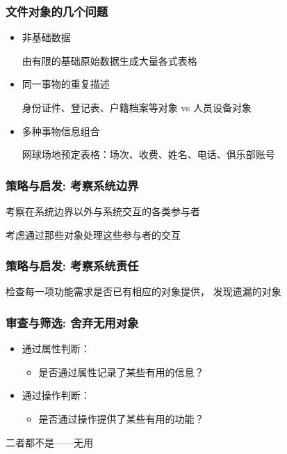 \documentclass[compress]{beamer}
\begin{document}
\begin{frame}
  \frametitle{文件对象的几个问题}
  \begin{itemize}
    \item 非基础数据
      \begin{example}
        由有限的基础原始数据生成大量各式表格
      \end{example}
    \item 同一事物的重复描述
      \begin{example}
       身份证件、登记表、户籍档案等对象 vs 人员设备对象 
      \end{example}
    \item 多种事物信息组合
      \begin{example}
        网球场地预定表格：场次、收费、姓名、电话、俱乐部账号
      \end{example}
  \end{itemize}
\end{frame}

\begin{frame}
  \frametitle{策略与启发: 考察系统边界}
  考察在系统边界以外与系统交互的各类参与者

  考虑通过那些对象处理这些参与者的交互 \\[3ex]
    \centering{}
 
\end{frame}

\begin{frame}
  \frametitle{策略与启发: 考察系统责任}
  检查每一项功能需求是否已有相应的对象提供，
  发现遗漏的对象
\end{frame}

\begin{frame}
  \frametitle{审查与筛选: 舍弃无用对象}
  \begin{itemize}
    \item 通过属性判断：
      \begin{itemize}
        \item 是否通过属性记录了某些有用的信息？
  \end{itemize}

\item 通过操作判断：
  \begin{itemize}
    \item 是否通过操作提供了某些有用的功能？
  \end{itemize}
  \end{itemize}
      二者都不是——无用
\end{frame}
\end{document}
